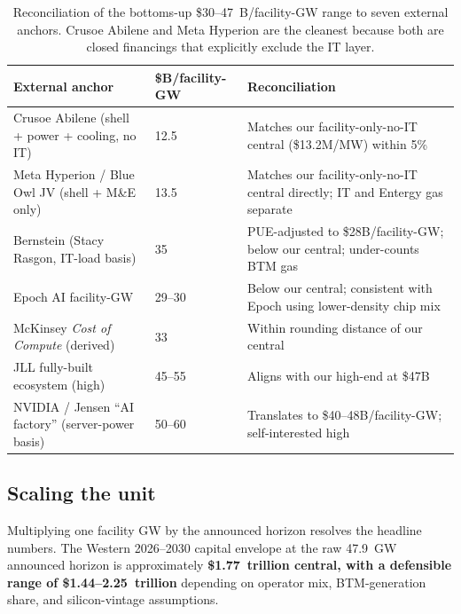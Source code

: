 \documentclass[11pt,a4paper]{article}
\begin{document}
\begin{table}[h]
\centering
\small
\begin{tabular}{@{}L{5.4cm}R{2.4cm}L{6.0cm}@{}}
\toprule
\textbf{External anchor} & \textbf{\$B/facility-GW} & \textbf{Reconciliation} \\
\midrule
Crusoe Abilene (shell + power + cooling, no IT) & 12.5 & Matches our facility-only-no-IT central (\$13.2M/MW) within 5\% \\
Meta Hyperion / Blue Owl JV (shell + M\&E only) & 13.5 & Matches our facility-only-no-IT central directly; IT and Entergy gas separate \\
Bernstein (Stacy Rasgon, IT-load basis) & 35 & PUE-adjusted to \$28B/facility-GW; below our central; under-counts BTM gas \\
Epoch AI facility-GW & 29--30 & Below our central; consistent with Epoch using lower-density chip mix \\
McKinsey \emph{Cost of Compute} (derived) & 33 & Within rounding distance of our central \\
JLL fully-built ecosystem (high) & 45--55 & Aligns with our high-end at \$47B \\
NVIDIA / Jensen ``AI factory'' (server-power basis) & 50--60 & Translates to \$40--48B/facility-GW; self-interested high \\
\bottomrule
\end{tabular}
\caption{Reconciliation of the bottoms-up \$30--47~B/facility-GW range to seven external anchors. Crusoe Abilene and Meta Hyperion are the cleanest because both are closed financings that explicitly exclude the IT layer.}
\label{tab:capex-reconciliation}
\end{table}

\subsection{Scaling the unit}
\label{subsec:scaling-the-unit}

Multiplying one facility GW by the announced horizon resolves the headline numbers. The Western 2026--2030 capital envelope at the raw 47.9~GW announced horizon is approximately \textbf{\$1.77~trillion central, with a defensible range of \$1.44--2.25~trillion} depending on operator mix, BTM-generation share, and silicon-vintage assumptions.
\end{document}
